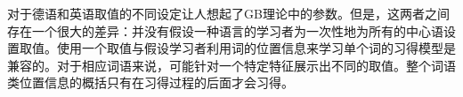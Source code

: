 对于德语和英语\initialvc 取值的不同设定让人想起了GB理论中的参数。但是，这两者之间存在一个很大的差异：并没有假设一种语言的学习者为一次性地为所有的中心语设置\initialvc 取值。使用一个\initialvc 取值与假设学习者利用词的位置信息来学习单个词的习得模型是兼容的。对于相应词语来说，可能针对一个特定特征展示出不同的取值。整个词语类位置信息的概括只有在习得过程的后面才会习得。

